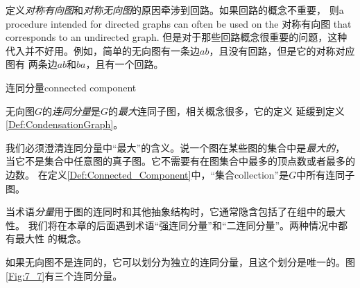 定义\emph{对称有向图}和\emph{对称无向图}的原因牵涉到回路。如果回路的概念不重要，
则a procedure intended for directed graphs can often be used on the 对称有向图
that corresponds to an undirected graph. 但是对于那些回路概念很重要的问题，这种
代入并不好用。例如，简单的无向图有一条边$ab$，且没有回路，但是它的对称对应图有
两条边$ab$和$ba$，且有一个回路。

\begin{definition}\label{Def:Connected_Component}
连同分量connected component

无向图$G$的\emph{连同分量}是$G$的\emph{最大}连同子图，相关概念很多，它的定义
延缓到定义\ref{Def:CondensationGraph}。
\end{definition}

我们必须澄清连同分量中“最大”的含义。说一个图在某些图的集合中是\emph{最大的}，
当它不是集合中任意图的真子图。它不需要有在图集合中最多的顶点数或者最多的边数。
在定义\ref{Def:Connected_Component}中，“集合collection”是$G$中所有连同子图。

当术语\emph{分量}用于图的连同时和其他抽象结构时，它通常隐含包括了在组中的最大性。
我们将在本章的后面遇到术语“强连同分量”和“二连同分量”。两种情况中都有最大性
的概念。

\begin{figure*}[!t]
    \centering
    \caption{有三个连同分量的图}
    \label{Fig:7_7}
\end{figure*}

如果无向图不是连同的，它可以划分为独立的连同分量，且这个划分是唯一的。图
\ref{Fig:7_7}有三个连同分量。

